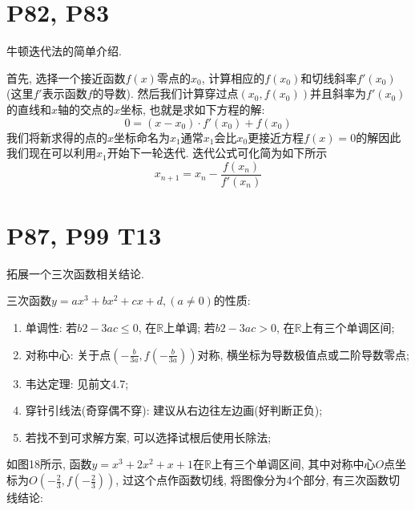 \documentclass{book}
\begin{document}
    \section{\textcolor[rgb]{0.11,0.65,0.52}{P82, P83}}
    \textcolor[rgb]{0.38,0.11,0.2}{牛顿迭代法}的简单介绍.\cite{Newton}

    首先, 选择一个接近函数${\displaystyle f(x)}$零点的${\displaystyle x_{0}}$, 计算相应的${\displaystyle f(x_{0})}$和切线斜率${\displaystyle f'(x_{0})}$(这里${\displaystyle f'}$表示函数${\displaystyle f}$的导数). 然后我们计算穿过点${\displaystyle (x_{0},f(x_{0}))}$并且斜率为${\displaystyle f'(x_{0})}$的直线和${\displaystyle x}$轴的交点的${\displaystyle x}$坐标, 也就是求如下方程的解:$${\displaystyle 0=(x-x_{0})\cdot f'(x_{0})+f(x_{0})}$$
    我们将新求得的点的${\displaystyle x}$坐标命名为${\displaystyle x_{1}}$通常${\displaystyle x_{1}}$会比${\displaystyle x_{0}}$更接近方程${\displaystyle f(x)=0}$的解因此我们现在可以利用${\displaystyle x_{1}}$开始下一轮迭代. 迭代公式可化简为如下所示$${\displaystyle x_{n+1}=x_{n}-{\frac {f(x_{n})}{f'(x_{n})}}}$$

    \section{\textcolor[rgb]{0.11,0.65,0.52}{P87, P99 T13}}

    拓展一个\textcolor[rgb]{0.38,0.11,0.2}{三次函数}相关结论.

    三次函数$\displaystyle y=ax^3+bx^2+cx+d,(a\neq 0)$的性质:
    \begin{enumerate}
        \item 单调性: 若$b2-3ac\leqslant 0$, 在$\mathbb{R}$上单调; 若$b2-3ac> 0$, 在$\mathbb{R}$上有三个单调区间;
        \item 对称中心: 关于点$\displaystyle \left( -\frac{b}{3a},f\left( -\frac{b}{3a} \right) \right)$对称, \textcolor[rgb]{0.75,0.17,0.22}{横坐标为导数极值点或二阶导数零点};
        \item 韦达定理: 见前文4.7;
        \item 穿针引线法(奇穿偶不穿): 建议从右边往左边画(好判断正负);
        \item 若找不到可求解方案, 可以选择试根后使用长除法;
    \end{enumerate}

    如图18所示, 函数$y=x^3+2x^2+x+1$在$\mathbb{R}$上有三个单调区间, 其中对称中心$O$点坐标为$\displaystyle O\left ( -\frac{2}{3},f\left ( -\frac{2}{3} \right )  \right ) $, 过这个点作函数切线, 将图像分为4个部分, 有三次函数切线结论:
\end{document}
